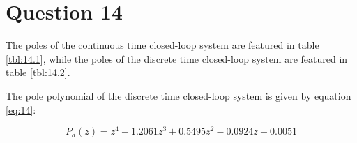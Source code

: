 \section{Question 14}

The poles of the continuous time closed-loop system are featured in table
\ref{tbl:14.1}, while the poles of the discrete time closed-loop system are
featured in table \ref{tbl:14.2}.

\begin{table}
\centering
{}
\end{table}

The pole polynomial of the discrete time closed-loop system is given by equation
\ref{eq:14}:

\begin{equation}
  P_d(z) = z^4 - 1.2061z^3 + 0.5495z^2 - 0.0924z + 0.0051
  \label{eq:14}
\end{equation}

